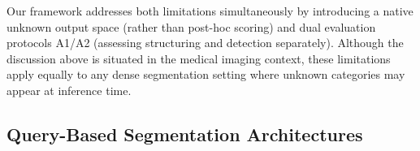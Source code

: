 \documentclass[3p,twocolumn,authoryear]{elsarticle}
\begin{document}
Our framework addresses both limitations simultaneously by introducing a native
unknown output space (rather than post-hoc scoring) and dual evaluation protocols
A1/A2 (assessing structuring and detection separately).
Although the discussion above is situated in the medical imaging context,
these limitations apply equally to any dense segmentation setting where unknown
categories may appear at inference time.



\subsection{Query-Based Segmentation Architectures}
\label{sec:rw-query}
\end{document}
